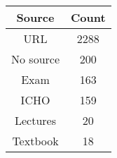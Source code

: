 \begin{tabular}{cc}
\toprule
Source & Count \\
\midrule
URL & 2288 \\
No source & 200 \\
Exam & 163 \\
ICHO & 159 \\
Lectures & 20 \\
Textbook & 18 \\
\bottomrule
\end{tabular}
